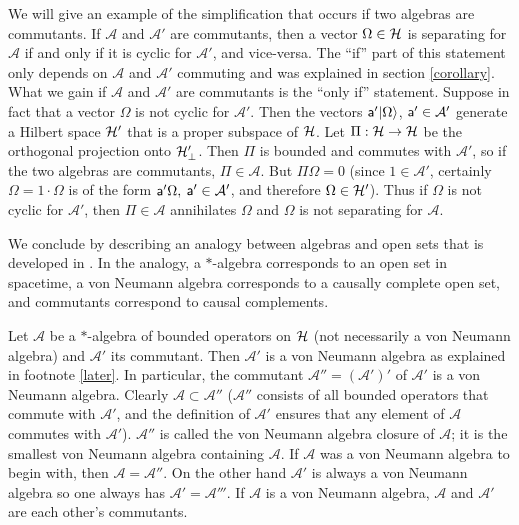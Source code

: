 \documentclass[12pt]{article}
\def\a{{\sf a}}
\numberwithin{equation}{section}
\def\A{{\mathcal A}}
\begin{document}
 We will give an example of the simplification that occurs if two algebras are commutants.
If $\A$ and $\A'$ are commutants, then
 a vector $\Omega\in{\mathcal H}$ is separating for $\A$ if and only if it is cyclic for $\A'$, and vice-versa.   The ``if'' part of
 this statement only depends on $\A$ and $\A'$ commuting and was explained in  section
 \ref{corollary}.   What we gain if $\A$ and $\A'$ are commutants is the ``only if'' statement.  Suppose in fact that a vector 
$\Omega$ is not cyclic for $\A'$.   Then the vectors $\a'|\Omega\rangle$, $\a'\in \A'$
generate a Hilbert space  ${\mathcal H}'$ that is a proper subspace of ${\mathcal H}$.  
 Let $\Pi:{\mathcal H}\to{\mathcal H}$ be the orthogonal projection onto ${\mathcal H}'_\perp$.  Then $\Pi$ is bounded and commutes
with $\A'$, so if the two algebras are commutants, $\Pi\in\A$.   But $\Pi\Omega=0$ (since $1\in\A'$, certainly
$\Omega=1\cdot\Omega$ is of the form $\a'\Omega,$ $\a'\in\A'$, and therefore $\Omega\in{\mathcal H}'$).   Thus if $\Omega$
is not cyclic for $\A'$, then $\Pi\in\A$ annihilates $\Omega$ and $\Omega$ is not separating for $\A$.




We conclude by describing an analogy between algebras and open sets that is developed in \cite{Haag}.  In the analogy,
a $*$-algebra corresponds to an open set in spacetime,  a von Neumann algebra corresponds to a causally complete open set,
and commutants correspond to causal complements.

  Let $\A$
be a $*$-algebra of bounded operators on ${\mathcal H}$ (not necessarily a von Neumann algebra) and $\A'$ its commutant.
Then $\A'$ is a von Neumann algebra as explained in footnote \ref{later}.  In particular, the commutant $\A''=(\A')'$ of $\A'$ is
a von Neumann algebra.  Clearly $\A\subset \A''$ ($\A''$ consists of all bounded operators that commute with $\A'$,
and the definition of $\A'$ ensures that any element of $\A$ commutes with $\A'$).   $\A''$ is called the von Neumann algebra closure of $\A$; it is the smallest
von Neumann algebra containing $\A$.  If $\A$ was a von Neumann algebra to begin with, then $\A=\A''$.  On the other hand
$\A'$ is always a von Neumann algebra so one always has $\A'=\A'''$.  If $\A$ is a von Neumann algebra, $\A$ and $\A'$ are each other's
commutants. 
\end{document}
